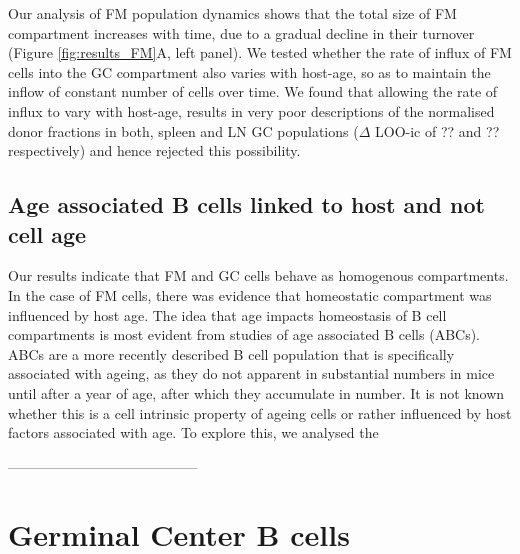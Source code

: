 \documentclass[11pt,onecolumn]{article}
\newcommand{\red}[1]{{\color{red}{#1}}}
\begin{document}
{Our analysis of FM population dynamics shows that the total size of FM compartment increases with time, due to a gradual decline in their turnover (Figure \ref{fig:results_FM}A, left panel).
We tested whether the rate of influx of FM cells into the GC compartment also varies with host-age, so as to maintain the inflow of constant number of cells over time. 
We found that allowing the rate of influx to vary with host-age, results in very poor descriptions of the normalised donor fractions in both, spleen and LN GC populations ($\Delta$ LOO-ic of ?? and ?? respectively) and hence rejected this possibility.
\red{Therefore, follicular cells maturing into the GC compartment at any given time are proportional to the size of the FM population at that moment.}



\subsection*{Age associated  B cells linked to host and not cell age}
Our results  indicate that FM and GC cells behave as homogenous compartments. In the case of FM cells, there was evidence that homeostatic compartment was influenced by host age. The idea that age impacts homeostasis of B cell compartments is most evident from studies of age associated B cells (ABCs).  ABCs are a more recently described B cell population that is specifically associated with ageing, as they do not apparent in substantial numbers in mice until after a year of age, after which they accumulate in number. It is not known whether this is a cell intrinsic property of ageing cells or rather influenced by host factors associated with age. To explore this, we analysed the 


}

-----------------------------------------





	\section*{Germinal Center B cells}
	
\end{document}
